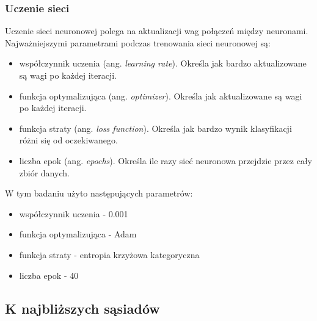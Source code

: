 \subsubsection{Uczenie sieci}\label{subsubsec:uczenie_sieci}
Uczenie sieci neuronowej polega na aktualizacji wag połączeń między neuronami.
Najważniejszymi parametrami podczas trenowania sieci neuronowej są:
\begin{itemize}
    \item współczynnik uczenia (ang. \textit{learning rate}). Określa jak bardzo aktualizowane są wagi po każdej iteracji.
    \item funkcja optymalizująca (ang. \textit{optimizer}). Określa jak aktualizowane są wagi po każdej iteracji.
    \item funkcja straty (ang. \textit{loss function}). Określa jak bardzo wynik klasyfikacji różni się od oczekiwanego.
    \item liczba epok (ang. \textit{epochs}). Określa ile razy sieć neuronowa przejdzie przez cały zbiór danych.
\end{itemize}
W tym badaniu użyto następujących parametrów:
\begin{itemize}
    \item współczynnik uczenia - 0.001
    \item funkcja optymalizująca - Adam
    \item funkcja straty - entropia krzyżowa kategoryczna
    \item liczba epok - 40
\end{itemize}
\subsection{K najbliższych sąsiadów}\label{sec:k_najblizszych_sasiadow}